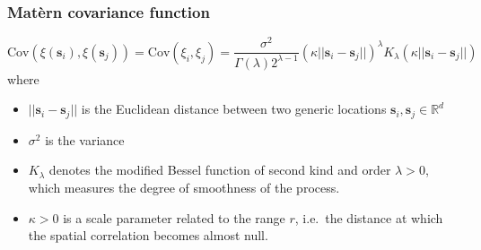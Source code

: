 \documentclass[slidestop,compress,serif,10pt]{beamer}
\begin{document}

\begin{frame}
\frametitle{Mat\`ern covariance function}
\vspace{-0.5cm}
\[
\text{Cov}(\xi(\bm s_i),\xi(\bm s_j))= \text{Cov}(\xi_i,\xi_j)=\frac{\sigma^2}{\Gamma(\lambda)2^{\lambda-1}}\left(\kappa ||\bm s_i - \bm s_j||\right)^\lambda K_\lambda\left(\kappa ||\bm s_i - \bm s_j||\right)
\]
where
\begin{itemize}

\item  $||\bm s_i - \bm s_j||$  is the Euclidean distance between two generic locations $\bm s_i, \bm s_j \in \mathbb{R}^d$
\item $\sigma^2$  is the \alert{variance}
\item $K_\lambda$  denotes the modified Bessel function of second kind and order $\lambda>0$, which measures the degree of \alert{smoothness} of the process. 
\item $\kappa>0$  is a \alert{scale} parameter related to the range $r$, i.e.\ the distance at which the spatial correlation becomes almost null. 


\end{itemize}
\end{frame}
\end{document}
